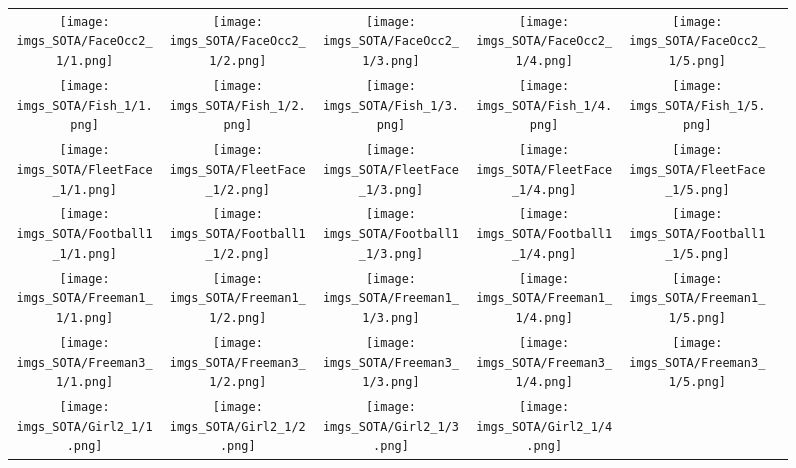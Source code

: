\begin{figure}[H]
\setlength{\tabcolsep}{6pt}
\renewcommand{\arraystretch}{0}
\begin{tabular}{@{}c@{}c@{}c@{}c@{}c@{}c@{}}\texttt{[image: imgs\_SOTA/FaceOcc2\_1/1.png]}&
\texttt{[image: imgs\_SOTA/FaceOcc2\_1/2.png]}&
\texttt{[image: imgs\_SOTA/FaceOcc2\_1/3.png]}&
\texttt{[image: imgs\_SOTA/FaceOcc2\_1/4.png]}&
\texttt{[image: imgs\_SOTA/FaceOcc2\_1/5.png]}&
\\
\texttt{[image: imgs\_SOTA/Fish\_1/1.png]}&
\texttt{[image: imgs\_SOTA/Fish\_1/2.png]}&
\texttt{[image: imgs\_SOTA/Fish\_1/3.png]}&
\texttt{[image: imgs\_SOTA/Fish\_1/4.png]}&
\texttt{[image: imgs\_SOTA/Fish\_1/5.png]}&
\\
\texttt{[image: imgs\_SOTA/FleetFace\_1/1.png]}&
\texttt{[image: imgs\_SOTA/FleetFace\_1/2.png]}&
\texttt{[image: imgs\_SOTA/FleetFace\_1/3.png]}&
\texttt{[image: imgs\_SOTA/FleetFace\_1/4.png]}&
\texttt{[image: imgs\_SOTA/FleetFace\_1/5.png]}&
\\
\texttt{[image: imgs\_SOTA/Football1\_1/1.png]}&
\texttt{[image: imgs\_SOTA/Football1\_1/2.png]}&
\texttt{[image: imgs\_SOTA/Football1\_1/3.png]}&
\texttt{[image: imgs\_SOTA/Football1\_1/4.png]}&
\texttt{[image: imgs\_SOTA/Football1\_1/5.png]}&
\\
\texttt{[image: imgs\_SOTA/Freeman1\_1/1.png]}&
\texttt{[image: imgs\_SOTA/Freeman1\_1/2.png]}&
\texttt{[image: imgs\_SOTA/Freeman1\_1/3.png]}&
\texttt{[image: imgs\_SOTA/Freeman1\_1/4.png]}&
\texttt{[image: imgs\_SOTA/Freeman1\_1/5.png]}&
\\
\texttt{[image: imgs\_SOTA/Freeman3\_1/1.png]}&
\texttt{[image: imgs\_SOTA/Freeman3\_1/2.png]}&
\texttt{[image: imgs\_SOTA/Freeman3\_1/3.png]}&
\texttt{[image: imgs\_SOTA/Freeman3\_1/4.png]}&
\texttt{[image: imgs\_SOTA/Freeman3\_1/5.png]}&
\\
\texttt{[image: imgs\_SOTA/Girl2\_1/1.png]}&
\texttt{[image: imgs\_SOTA/Girl2\_1/2.png]}&
\texttt{[image: imgs\_SOTA/Girl2\_1/3.png]}&
\texttt{[image: imgs\_SOTA/Girl2\_1/4.png]}&

\end{tabular}
\end{figure}
